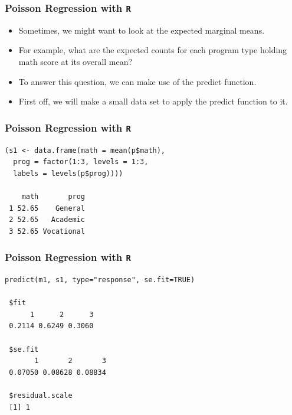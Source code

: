 \documentclass[00-GLMregslides.tex]{subfiles}
\begin{document}
\begin{frame}[fragile]

\frametitle{Poisson Regression with \texttt{R}}
\Large
\begin{itemize}
\item Sometimes, we might want to look at the expected marginal means. 
\item For example, what are the expected counts for each program type holding math score at its overall mean? 
\item To answer this question, we can make use of the predict function. 
\item First off, we will make a small data set to apply the predict function to it.
\end{itemize}

\end{frame}

\begin{frame}[fragile]

\frametitle{Poisson Regression with \texttt{R}}
\normalsize 

\begin{framed}
\begin{verbatim}
(s1 <- data.frame(math = mean(p$math),
  prog = factor(1:3, levels = 1:3, 
  labels = levels(p$prog))))
 
    math       prog
 1 52.65    General
 2 52.65   Academic
 3 52.65 Vocational
\end{verbatim}
\end{framed}
\end{frame}

\begin{frame}[fragile]

\frametitle{Poisson Regression with \texttt{R}}
\normalsize 

\begin{framed}
\begin{verbatim}
predict(m1, s1, type="response", se.fit=TRUE)
 
 $fit
      1      2      3 
 0.2114 0.6249 0.3060 
 
 $se.fit
       1       2       3 
 0.07050 0.08628 0.08834 
 
 $residual.scale
 [1] 1
\end{verbatim}
\end{framed}
\end{frame}
\end{document}
